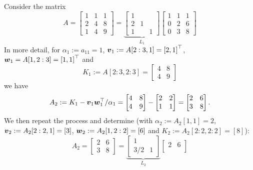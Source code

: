 \begin{example}[LU by-hand] Consider the matrix
\[
A = \begin{bmatrix} 1 & 1 & 1 \\
                    2 & 4 & 8 \\
                    1 & 4 & 9
                    \end{bmatrix} = \underbrace{\begin{bmatrix} 1  \\
                    2 & 1 &  \\
                    1 &  & 1
                    \end{bmatrix}}_{L_1} \begin{bmatrix} 1 & 1 & 1 \\
                    0 & 2 & 6 \\
                    0 & 3 & 8
                    \end{bmatrix}
\]
In more detail, for $\ensuremath{\alpha}_1 := a_{11} = 1$, $\ensuremath{\bm{\v}}_1 := A[2:3,1] = \vectt[2,1]$, $\ensuremath{\bm{\w}}_1 = A[1,2:3] = \vectt[1,1]$ and
\[
K_1 := A[2:3,2:3] = \begin{bmatrix} 4 & 8 \\ 4 & 9 \end{bmatrix}
\]
we have
\[
A_2 := K_1 -\bm{{\mbox{\boldmath$v$\unboldmath}}}_1\bm{{\mbox{\boldmath$w$\unboldmath}}}_1^\top /\alpha_1 = \begin{bmatrix} 4 & 8 \\ 4 & 9 \end{bmatrix} - \begin{bmatrix} 2 & 2 \\ 1 & 1 \end{bmatrix} = \begin{bmatrix} 2 & 6 \\ 3 & 8 \end{bmatrix}.
\]
We then repeat the process and determine (with $\ensuremath{\alpha}_2 := A_2[1,1] = 2$, $\bm{{\mbox{\boldmath$v$\unboldmath}}}_2 := A_2[2:2,1] = [3]$, $\bm{{\mbox{\boldmath$w$\unboldmath}}}_2 := A_2[1,2:2] = [6]$ and $K_2 := A_2[2:2,2:2] = [8]$):
\[
A_2 =  \begin{bmatrix}2 & 6 \\ 3 & 8 \end{bmatrix} =
\underbrace{\begin{bmatrix}
1 \\
3/2 & 1
\end{bmatrix}}_{L_2} \begin{bmatrix} 2 & 6 \\

\end{bmatrix}\]
\end{example}
